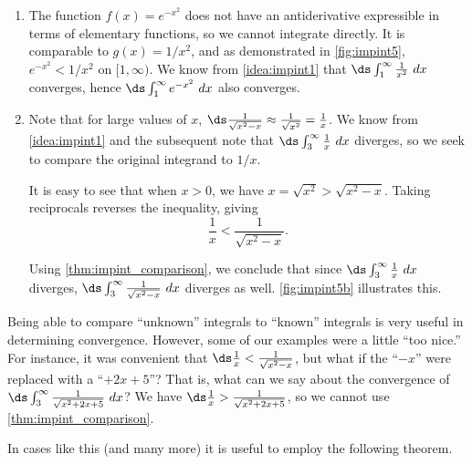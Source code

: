 {\begin{enumerate}
\item		The function $f(x) = e^{-x^2}$ does not have an antiderivative expressible in terms of elementary functions, so we cannot integrate directly. It is comparable to $g(x)=1/x^2$, and as demonstrated in \autoref{fig:impint5}, $e^{-x^2} < 1/x^2$ on $[1,\infty)$. We know from \autoref{idea:impint1} that $\ds \int_1^\infty \frac{1}{x^2}\ dx$ converges, hence $\ds\int_1^\infty e^{-x^2}\ dx$ also converges.

\item		Note that for large values of $x$, $\ds \frac{1}{\sqrt{x^2-x}} \approx \frac{1}{\sqrt{x^2}} =\frac{1}{x}$. We know from \autoref{idea:impint1} and the subsequent note that  $\ds \int_3^\infty \frac1x\ dx$ diverges, so we seek to compare the original integrand to $1/x$.

It is easy to see that when $x>0$, we have $x = \sqrt{x^2} > \sqrt{x^2-x}$. Taking reciprocals reverses the inequality, giving $$\frac1x < \frac1{\sqrt{x^2-x}}.$$

Using \autoref{thm:impint_comparison}, we conclude that since $\ds\int_3^\infty\frac1x\ dx$ diverges, $\ds\int_3^\infty\frac1{\sqrt{x^2-x}}\ dx$ diverges as well. \autoref{fig:impint5b} illustrates this.\eoehere

\end{enumerate}}

Being able to compare ``unknown'' integrals to ``known'' integrals is very useful in determining convergence. However, some of our examples were a little ``too nice.'' For instance, it was convenient that $\ds \frac{1}x < \frac{1}{\sqrt{x^2-x}}$, but what if the ``$-x$'' were replaced with a ``$+2x+5$''? That is, what can we say about the convergence of $\ds \int_3^\infty\frac{1}{\sqrt{x^2+2x+5}}\ dx$? We have $\ds \frac{1}{x} > \frac1{\sqrt{x^2+2x+5}}$, so we cannot use \autoref{thm:impint_comparison}.

In cases like this (and many more) it is useful to employ the following theorem.

